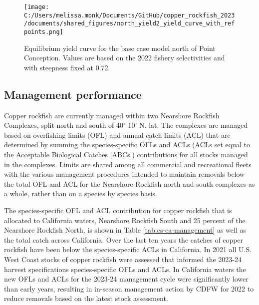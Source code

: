 \documentclass[11pt,
  english,
  letterpaper,
]{article}
\begin{document}
\begin{figure}
\centering
\texttt{[image: C:/Users/melissa.monk/Documents/GitHub/copper\_rockfish\_2023/documents/shared\_figures/north\_yield2\_yield\_curve\_with\_refpoints.png]}
\caption{Equilibrium yield curve for the base case model north of Point Conception. Values are based on the 2022 fishery selectivities and with steepness fixed at 0.72.\label{fig:north-es-yield}}
\end{figure}

\pagebreak

\hypertarget{management-performance}{%
\subsection*{Management performance}\label{management-performance}}

Copper rockfish are currently managed within two Nearshore Rockfish Complexes, split north and south of 40\(^\circ\) 10' N. lat. The complexes are managed based on overfishing limits (OFL) and annual catch limits (ACL) that are determined by summing the species-specific OFLs and ACLs (ACLs set equal to the Acceptable Biological Catches {[}ABCs{]}) contributions for all stocks managed in the complexes. Limits are shared among all commercial and recreational fleets with the various management procedures intended to maintain removals below the total OFL and ACL for the Nearshore Rockfish north and south complexes as a whole, rather than on a species by species basis.

The species-specific OFL and ACL contribution for copper rockfish that is allocated to California waters, Nearshore Rockfish South and 25 percent of the Nearshore Rockfish North, is shown in Table \ref{tab:es-ca-management} as well as the total catch across California. Over the last ten years the catches of copper rockfish have been below the species-specific ACLs in California. In 2021 all U.S. West Coast stocks of copper rockfish were assessed that informed the 2023-24 harvest specifications species-specific OFLs and ACLs. In California waters the new OFLs and ACLs for the 2023-24 management cycle were significantly lower than early years, resulting in in-season management action by CDFW for 2022 to reduce removals based on the latest stock assessment.

\begingroup\fontsize{10}{12}\selectfont
\begingroup\fontsize{10}{12}\selectfont
\end{document}
